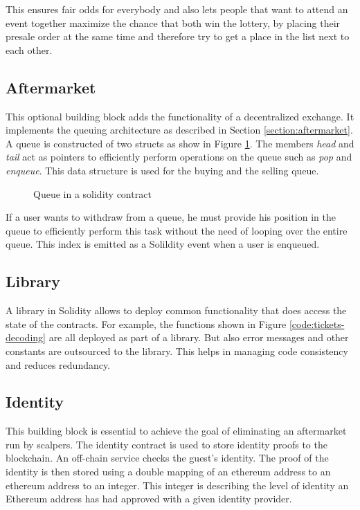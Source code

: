 This ensures fair odds for everybody and also lets people that want to attend an event together maximize the chance that both win the lottery, by placing their presale order at the same time and therefore try to get a place in the list next to each other.

\subsection{Aftermarket}
This optional building block adds the functionality of a decentralized exchange. It implements the queuing architecture as described in Section \ref{section:aftermarket}. A queue is constructed of two structs as show in Figure \ref{code:queue}. The members \textit{head} and \textit{tail} act as pointers to efficiently perform operations on the queue such as \textit{pop} and \textit{enqueue}. This data structure is used for the buying and the selling queue. 

\begin{figure}[H]
    
    \caption{Queue in a solidity contract}
    \label{code:queue}
\end{figure}

If a user wants to withdraw from a queue, he must provide his position in the queue to efficiently perform this task without the need of looping over the entire queue. This index is emitted as a Solildity event when a user is enqueued. 

\subsection{Library}
A library in Solidity allows to deploy common functionality that does access the state of the contracts. For example, the functions shown in Figure \ref{code:tickets-decoding} are all deployed as part of a library. But also error messages and other constants are outsourced to the library. This helps in managing code consistency and reduces redundancy.

\subsection{Identity}
This building block is essential to achieve the goal of eliminating an aftermarket run by scalpers. The identity contract is used to store identity proofs to the blockchain. An off-chain service checks the guest's identity. The proof of the identity is then stored using a double mapping of an ethereum address to an ethereum address to an integer. This integer is describing the level of identity an Ethereum address has had approved with a given identity provider. 

